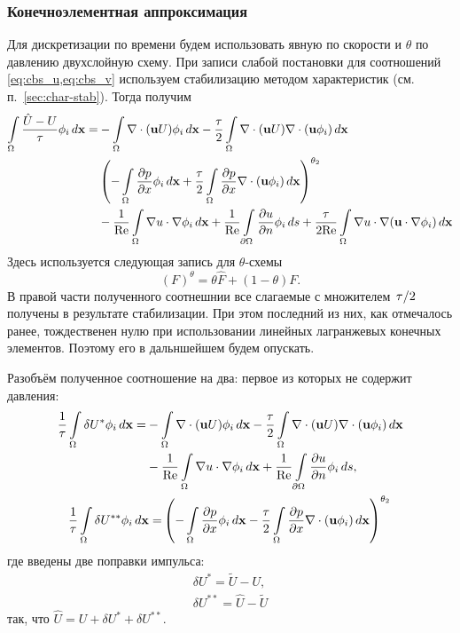 \subsubsection{Конечноэлементная аппроксимация}
Для дискретизации по времени будем использовать явную по скорости и $\theta$ по давлению двухслойную схему.
При записи слабой постановки для соотношений \cref{eq:cbs_u,eq:cbs_v}
используем стабилизацию методом характеристик (см. п.~\ref{sec:char-stab}).
Тогда получим
\begin{equation}
\nonumber
\begin{split}
\displaystyle\int\limits_{\Omega}\frac{\hat U - U}{\tau}\phi_i \, d \boldsymbol{\rm x} =
&- \displaystyle\int\limits_{\Omega}\nabla\cdot(\boldsymbol{\rm u}  U) \phi_i \, d \boldsymbol{\rm x}
 -\frac{\tau}{2}\displaystyle\int\limits_{\Omega}\nabla \cdot(\boldsymbol{\rm u} U) \nabla\cdot(\boldsymbol{\rm u} \phi_i) \, d \boldsymbol{\rm x}
\\
&
 \left(
 -\displaystyle\int\limits_{\Omega}\frac{\partial p}{\partial x}\phi_i \, d \boldsymbol{\rm x}
 +\frac{\tau}{2}\displaystyle\int\limits_{\Omega}\frac{\partial p}{\partial x}\nabla\cdot(\boldsymbol{\rm u} \phi_i) \, d \boldsymbol{\rm x}
 \right)^{\theta_2}
\\
&
 -\frac{1}{\mathrm{Re}}\displaystyle\int\limits_{\Omega}\nabla u \cdot \nabla \phi_i \, d \boldsymbol{\rm x}
 +\frac{1}{\mathrm{Re}}\displaystyle\int\limits_{\partial\Omega}\frac{\partial u}{\partial n}\phi_i \, d s
 +\frac{\tau}{2\mathrm{Re}}\displaystyle\int\limits_{\Omega}\nabla u \cdot \nabla (\boldsymbol{\rm u} \cdot \nabla \phi_i) \, d \boldsymbol{\rm x}
\end{split}
\end{equation}
Здесь используется следующая запись для $\theta$-схемы
$$
\left( F\right)^{\theta} = \theta \hat F + (1 - \theta) F.
$$
В правой части полученного соотнешнии все слагаемые с
множителем $\left.\tau\middle/2\right.$ получены в результате стабилизации.
При этом последний из них, как отмечалось ранее,
тождественен нулю при использовании линейных лагранжевых
конечных элементов. Поэтому его в дальншейшем будем опускать.

Разобъём полученное соотношение на два: первое из которых не содержит давления:
\begin{align}
\label{eq:cbs_split1}
\begin{split}
\frac{1}{\tau}\feint{\delta U^*\phi_i} =
&- \feint{\nabla\cdot (\vec u U) \phi_i}
 -\frac{\tau}{2}\feint{\nabla\cdot(\vec u U) \nabla\cdot(\vec u \phi_i)}
\\
&
 -\frac{1}{\Ren}\feint{\nabla u \cdot \nabla \phi_i}
 +\frac{1}{\Ren}\febint{\dfr{u}{n}\phi_i},
\end{split}\\
\label{eq:cbs_split2}
\begin{split}
\frac1\tau\feint{\delta U^{**}\phi_i} =
&
 \left(
 -\feint{\dfr{p}{x}\phi_i}
 -\frac{\tau}{2}\feint{\dfr{p}{x}\nabla\cdot (\vec u \phi_i)}
 \right)^{\theta_2}
\end{split}
\end{align}
где введены две поправки импульса:
\begin{align*}
\delta U^* = \tilde U - U, \\
\delta U^{**} = \hat U - \tilde U
\end{align*}
так, что $\hat U = U + \delta U^* + \delta U^{**}$.

